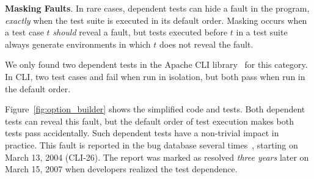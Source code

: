 

\vspace{1mm}

\noindent \textbf{Masking Faults}. In rare cases,
dependent tests can hide a fault in the
program, \emph{exactly} when the test suite is executed in its default
order. Masking occurs when a test case $t$ \emph{should}
reveal a fault, but tests executed before $t$ in a test suite always
generate environments in which $t$ does not reveal the fault.



We only found two dependent tests in
the Apache CLI library~\cite{cli} for this category.
In CLI, two test cases 
 and 
fail when run in isolation,
but both pass when run in the default order.

Figure~\ref{fig:option_builder} shows the simplified code and
tests. Both dependent tests can reveal this fault,  but
the default order of test execution makes both tests pass
accidentally. Such dependent tests
have a non-trivial impact in practice.
This fault is reported in the bug
database several times~\cite{clibug}, starting on March 13, 2004 (CLI-26). The report was marked as resolved
\emph{three years} later on March 15, 2007 when developers
realized the test dependence.







